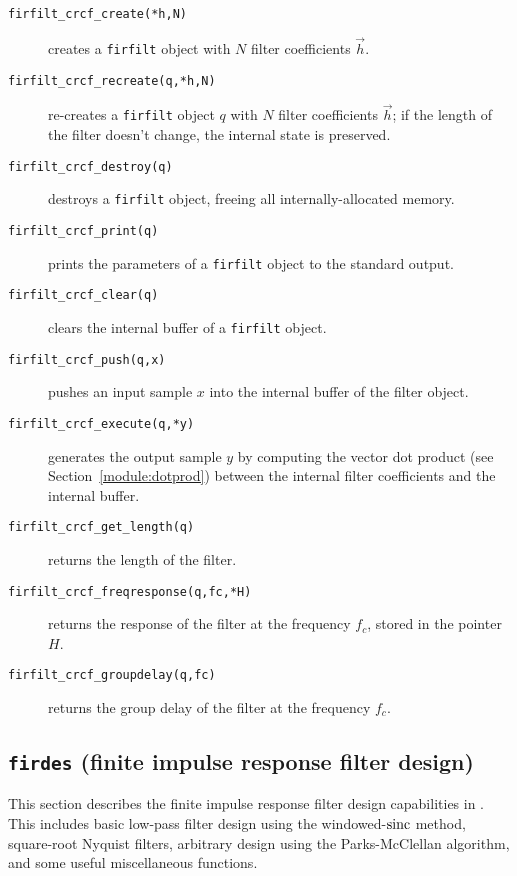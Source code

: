 \begin{description}
\item[{\tt firfilt\_crcf\_create(*h,N)}]
    creates a {\tt firfilt} object with $N$ filter coefficients
    $\vec{h}$.
\item[{\tt firfilt\_crcf\_recreate(q,*h,N)}]
    re-creates a {\tt firfilt} object $q$ with $N$ filter coefficients
    $\vec{h}$;
    if the length of the filter doesn't change, the internal state is
    preserved.
\item[{\tt firfilt\_crcf\_destroy(q)}]
    destroys a {\tt firfilt} object, freeing all internally-allocated
    memory.
\item[{\tt firfilt\_crcf\_print(q)}]
    prints the parameters of a {\tt firfilt} object to the standard
    output.
\item[{\tt firfilt\_crcf\_clear(q)}]
    clears the internal buffer of a {\tt firfilt} object.
\item[{\tt firfilt\_crcf\_push(q,x)}]
    pushes an input sample $x$ into the internal buffer of the filter
    object.
\item[{\tt firfilt\_crcf\_execute(q,*y)}]
    generates the output sample $y$ by computing the vector dot product
    (see Section~\ref{module:dotprod})
    between the internal filter coefficients and the internal buffer.
\item[{\tt firfilt\_crcf\_get\_length(q)}]
    returns the length of the filter.
\item[{\tt firfilt\_crcf\_freqresponse(q,fc,*H)}]
    returns the response of the filter at the frequency $f_c$, stored in
    the pointer $H$.
\item[{\tt firfilt\_crcf\_groupdelay(q,fc)}]
    returns the group delay of the filter at the frequency $f_c$.
\end{description}
%



% 
%

% 
%
\subsection{{\tt firdes} (finite impulse response filter design)}
\label{module:filter:firdes}
This section describes the finite impulse response filter design
capabilities in \liquid.
This includes basic low-pass filter design using the windowed-$\textup{sinc}$
method,
square-root Nyquist filters,
arbitrary design using the Parks-McClellan algorithm,
and some useful miscellaneous functions.

